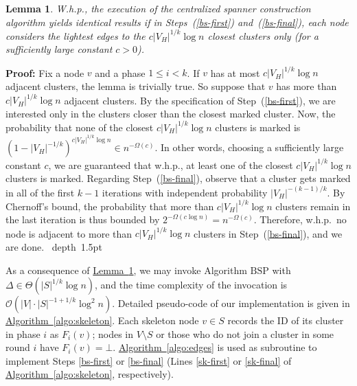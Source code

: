 \documentclass[letterpaper,11pt]{article}
\newcommand{\namedref}[2]{\hyperref[#2]{#1~\ref*{#2}}}
\newcommand{\lemmaref}[1]{\namedref{Lemma}{#1}}
\newcommand{\algref}[1]{\namedref{Algorithm}{#1}}
\newtheorem{lemma}[theorem]{Lemma}
\newcommand{\blackslug}{\hbox{\hskip 1pt \vrule width 4pt height 8pt
depth 1.5pt \hskip 1pt}}
\newcommand{\QED}{\quad\blackslug\lower 8.5pt\null\par}
\newenvironment{proof}[1][Proof:]{\noindent \textbf{#1}\xspace}{\QED}
\newcommand{\BO}{\mathcal{O}}
\newcommand{\BSP}{\mathrm{BSP}\xspace}
\begin{document}
\begin{lemma}\label{lem-reduce}
  W.h.p., the execution of the centralized spanner construction
  algorithm yields identical results if in Steps~(\ref{bs-first})
  and~(\ref{bs-final}), each node considers the lightest edges to the
  $c|V_H|^{1/k}\log n$ closest clusters only (for a sufficiently large
  constant $c>0$).
\end{lemma}
\begin{proof}
Fix a node $v$ and a phase $1\le i<k$. If $v$ has at most $c|V_H|^{1/k}\log n$
adjacent clusters, the lemma is trivially true. So suppose that $v$ has more
than $c|V_H|^{1/k}\log n$ adjacent clusters. By the specification of
Step~(\ref{bs-first}), we are interested only in the clusters closer than the
closest marked cluster. Now, the probability that none of the closest
$c|V_H|^{1/k}\log n$ clusters is marked is $(1-|V_H|^{-1/k})^{c|V_H|^{1/k}\log
n}\in n^{-\Omega(c)}$. In other words, choosing a sufficiently large constant
$c$, we are guaranteed that w.h.p., at least one of the closest
$c|V_H|^{1/k}\log n$ clusters is marked. Regarding Step~(\ref{bs-final}),
observe that a cluster gets marked in all of the first $k-1$ iterations with
independent probability $|V_H|^{-(k-1)/k}$. By Chernoff's bound, the probability
that more than $c|V_H|^{1/k}\log n$ clusters remain in the last iteration is
thus bounded by $2^{-\Omega(c\log n)}=n^{-\Omega(c)}$. Therefore, w.h.p.\ no
node is adjacent to more than $c|V_H|^{1/k}\log n$ clusters in
Step~(\ref{bs-final}), and we are done.
\end{proof}
As a consequence of \lemmaref{lem-reduce}, we may invoke Algorithm $\BSP$ with
$\Delta\in\Theta(|S|^{1/k}\log n)$, and the time complexity of the invocation is
$\BO(|V|\cdot|S|^{-1+1/k}\log^2n)$. Detailed pseudo-code of our implementation
is given in \algref{algo:skeleton}. Each skeleton node $v\in S$ records the ID
of its cluster in phase $i$ as $F_i(v)$; nodes in $V\setminus S$ or those who do
not join a cluster in some round $i$ have $F_i(v)=\bot$. \algref{algo:edges} is
used as subroutine to implement Steps \eqref{bs-first} or \eqref{bs-final}
(Lines \ref{sk-first} or \ref{sk-final} of \algref{algo:skeleton},
respectively).
\end{document}

